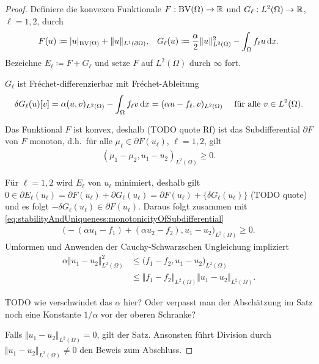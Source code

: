 \begin{proof}
  Definiere die konvexen Funktionale $F:\textup{BV}(\Omega)\to \mathbb{R}$ und 
  $G_\ell:L^2(\Omega)\to \mathbb{R}$, $\ell=1,2$, durch
  \begin{align*}
    F(u) &\coloneqq |u|_{\textup{BV}(\Omega)} + \Vert u \Vert_{L^1(\partial\Omega)},&
    G_\ell(u)\coloneqq \frac{\alpha}{2}\Vert u\Vert_{L^2(\Omega)}^2 -
    \int_\Omega f_\ell u\,\mathrm{d}x.
  \end{align*}
  Bezeichne $E_\ell\coloneqq F+G_\ell$ und setze $F$ auf $L^2(\Omega)$
  durch $\infty$ fort.

  $G_\ell$ ist Fr\'echet-differenzierbar mit Fr\'echet-Ableitung
  \begin{align*}
    \delta G_\ell(u)[v] = \alpha (u,v)_{L^2(\Omega)} - \int_\Omega f_\ell v\,\mathrm{d}x 
    = (\alpha u-f_\ell ,v)_{L^2(\Omega)} \quad 
    \text{ für alle } v\in L^2(\Omega).
  \end{align*}

  Das Funktional $F$ ist konvex, deshalb (TODO quote Rf) ist das Subdifferential
  $\partial F$ von $F$ monoton, d.h.\ für alle $\mu_\ell\in \partial F(u_\ell)$,
  $\ell=1,2$, gilt
  \begin{align}\label{eq:stabilityAndUniqueness:monotonicityOfSubdifferential}
    (\mu_1-\mu_2,u_1-u_2)_{L^2(\Omega)}\geq 0.
  \end{align}

  Für $\ell=1,2$ wird $E_\ell$ von $u_\ell$ minimiert, 
  deshalb gilt $0\in\partial E_\ell(u_\ell)
  = \partial F(u_\ell)+\partial G_\ell(u_\ell)=\partial F(u_\ell)+
  \{\delta G_\ell(u_\ell)\}$ (TODO quote) und es folgt
  $-\delta G_\ell(u_\ell)\in\partial F(u_\ell)$.
  Daraus folgt zusammen mit
  \eqref{eq:stabilityAndUniqueness:monotonicityOfSubdifferential}
  \begin{align*}
    \big( -(\alpha u_1 - f_1) + (\alpha u_2 - f_2), u_1 - u_2\big)_{L^2(\Omega)}
    \geq 0.
  \end{align*}
  Umformen und Anwenden der Cauchy-Schwarzschen Ungleichung impliziert
  \begin{align*}
    \alpha \Vert u_1 - u_2 \Vert_{L^2(\Omega)}^2
    &\leq
    \big(f_1 -f_2, u_1-u_2 \big)_{L^2(\Omega)}\\
    &\leq
    \Vert f_1-f_2\Vert_{L^2(\Omega)}\Vert u_1 - u_2\Vert_{L^2(\Omega)}.
  \end{align*}

  TODO wie verschwindet das $\alpha$ hier? Oder verpasst man der Abschätzung 
  im Satz noch eine Konstante $1/\alpha$ vor der oberen Schranke?

  Falls $\Vert u_1 - u_2 \Vert_{L^2(\Omega)} = 0$, gilt der Satz.
  Ansonsten führt Division durch \\
  $\Vert u_1 - u_2 \Vert_{L^2(\Omega)}\neq 0$ den 
  Beweis zum Abschluss.
\end{proof}
